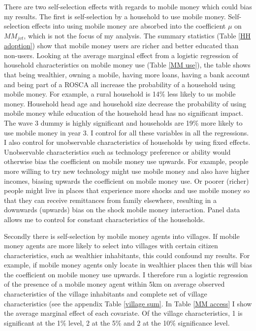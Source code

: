 There are two self-selection effects with regards to mobile money which could bias my results. The first is self-selection by a household to use mobile money. Self-selection effects into using mobile money are absorbed into the coefficient $\mu$ on $MM_{jvt}$, which is not the focus of my analysis. The summary statistics (Table \ref{HH adoption}) show that mobile money users are richer and better educated than non-users. Looking at the average marginal effect from a logistic regression of household characteristics on mobile money use (Table \ref{MM use}), the table shows that being wealthier, owning a mobile, having more loans, having a bank account and being part of a ROSCA all increase the probability of a household using mobile money. For example, a rural household is 14\% less likely to us mobile money. Household head age and household size decrease the probability of using mobile money while education of the household head has no significant impact. The wave 3 dummy is highly significant and households are 19\% more likely to use mobile money in year 3. I control for all these variables in all the regressions. I also control for unobservable characteristics of households by using fixed effects. Unobservable characteristics such as technology preference or ability would otherwise bias the coefficient on mobile money use upwards. For example, people more willing to try new technology might use mobile money and also have higher incomes, biasing upwards the coefficient on mobile money use. Or poorer (richer) people might live in places that experience more shocks and use mobile money so that they can receive remittances from family elsewhere, resulting in a downwards (upwards) bias on the shock mobile money interaction. Panel data allows me to control for constant characteristics of the households.  




Secondly there is self-selection by mobile money agents into villages. If mobile money agents are more likely to select into villages with certain citizen characteristics, such as wealthier inhabitants, this could confound my results. For example, if mobile money agents only locate in wealthier places then this will bias the coefficient on mobile money use upwards. I therefore run a logistic regression of the presence of a mobile money agent within 5km on average observed characteristics of the village inhabitants and complete set of village characteristics (see the appendix Table \ref{village sum}. In Table \ref{MM access} I show the average marginal effect of each covariate. Of the village characteristics, 1 is significant at the 1\% level, 2 at the 5\% and 2 at the 10\% significance level. 


